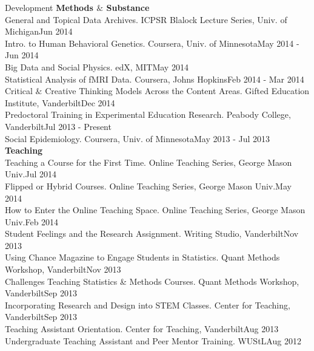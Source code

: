 \documentclass {resume}
\begin{document}

\begin{rSection}{\textrm{Development}}
{\large \textbf{Methods $\&$ Substance}}\\
General and Topical Data Archives. ICPSR Blalock Lecture Series, Univ. of Michigan\hfill  {Jun 2014}\smallskip\\
Intro. to Human Behavioral Genetics. Coursera, Univ. of Minnesota\hfill  {May 2014 - Jun 2014}\smallskip\\
Big Data and Social Physics. edX, MIT\hfill  {May 2014}\smallskip\\
Statistical Analysis of fMRI Data. Coursera, Johns Hopkins\hfill  {Feb 2014 - Mar 2014}\smallskip\\
Critical $\&$ Creative Thinking Models Across the Content Areas. Gifted Education Institute, Vanderbilt\hfill {Dec 2014}\smallskip\\
Predoctoral Training in Experimental Education Research. Peabody College, Vanderbilt\hfill  {Jul 2013 - Present}\smallskip\\
Social Epidemiology. Coursera, Univ. of Minnesota\hfill  {May 2013 - Jul 2013}%
\medskip\\
{\large {\bf Teaching}}\\
Teaching a Course for the First Time. Online Teaching Series, George Mason Univ.\hfill  {Jul 2014}\smallskip\\
Flipped or Hybrid Courses. Online Teaching Series, George Mason Univ.\hfill  {May 2014}\smallskip\\
How to Enter the Online Teaching Space. Online Teaching Series, George Mason Univ.\hfill  {Feb 2014}\smallskip\\
Student Feelings and the Research Assignment. Writing Studio, Vanderbilt\hfill  {Nov 2013}\smallskip\\
Using Chance Magazine to Engage Students in Statistics. Quant Methods Workshop, Vanderbilt\hfill  {Nov 2013}\smallskip\\
Challenges Teaching Statistics \& Methods Courses. Quant Methods Workshop, Vanderbilt\hfill  {Sep 2013}\smallskip\\
Incorporating Research and Design into STEM Classes. Center for Teaching, Vanderbilt\hfill  {Sep 2013}\smallskip\\
Teaching Assistant Orientation. Center for Teaching, Vanderbilt\hfill  {Aug 2013}\smallskip\\
Undergraduate Teaching Assistant and Peer Mentor Training. WUStL\hfill  {Aug 2012}
\end{rSection}
\end{document}
